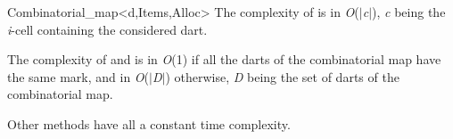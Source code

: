 \begin{ccRefClass}{Combinatorial_map<d,Items,Alloc>}
The complexity of  is in \emph{O}($|$\emph{c}$|$), \emph{c} being the
\emph{i}-cell containing the considered dart.

The complexity of  and  is in \emph{O}(1) if
all the darts of the combinatorial map have the same mark, and in
\emph{O}($|$\emph{D}$|$) otherwise, \emph{D} being the set of darts of the combinatorial
map.

Other methods have all a constant time complexity.

\ccSeeAlso
{}\\
\\

\end{ccRefClass}
\ccRefPageEnd
